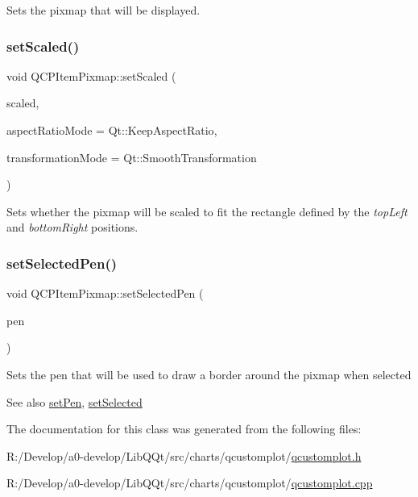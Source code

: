 Sets the pixmap that will be displayed. \mbox{\label{class_q_c_p_item_pixmap_ab4d44529a1c6c8d37d0ea7560e042777}} 
\subsubsection{\texorpdfstring{set\+Scaled()}{setScaled()}}
{\footnotesize\ttfamily void Q\+C\+P\+Item\+Pixmap\+::set\+Scaled (\begin{DoxyParamCaption}\item[{bool}]{scaled,  }\item[{Qt\+::\+Aspect\+Ratio\+Mode}]{aspect\+Ratio\+Mode = {\ttfamily Qt\+:\+:KeepAspectRatio},  }\item[{Qt\+::\+Transformation\+Mode}]{transformation\+Mode = {\ttfamily Qt\+:\+:SmoothTransformation} }\end{DoxyParamCaption})}

Sets whether the pixmap will be scaled to fit the rectangle defined by the {\itshape top\+Left} and {\itshape bottom\+Right} positions. \mbox{\label{class_q_c_p_item_pixmap_afc5e479e88e53740176ce77cb70dd67a}} 
\subsubsection{\texorpdfstring{set\+Selected\+Pen()}{setSelectedPen()}}
{\footnotesize\ttfamily void Q\+C\+P\+Item\+Pixmap\+::set\+Selected\+Pen (\begin{DoxyParamCaption}\item[{const Q\+Pen \&}]{pen }\end{DoxyParamCaption})}

Sets the pen that will be used to draw a border around the pixmap when selected

\begin{DoxySeeAlso}{See also}
\mbox{\hyperlink{class_q_c_p_item_pixmap_acdade1305edb4b5cae14f97fd132065f}{set\+Pen}}, \mbox{\hyperlink{class_q_c_p_abstract_item_a203de94ad586cc44d16c9565f49d3378}{set\+Selected}} 
\end{DoxySeeAlso}


The documentation for this class was generated from the following files\+:\begin{DoxyCompactItemize}
\item 
R\+:/\+Develop/a0-\/develop/\+Lib\+Q\+Qt/src/charts/qcustomplot/\mbox{\hyperlink{qcustomplot_8h}{qcustomplot.\+h}}\item 
R\+:/\+Develop/a0-\/develop/\+Lib\+Q\+Qt/src/charts/qcustomplot/\mbox{\hyperlink{qcustomplot_8cpp}{qcustomplot.\+cpp}}\end{DoxyCompactItemize}
